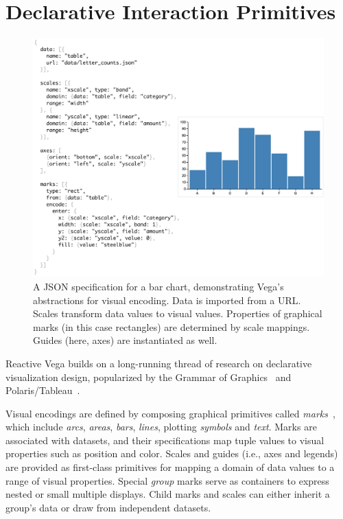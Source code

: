 \graphicspath{{./vega-lang/figures/}}
\chapter{Declarative Interaction Primitives}
\label{sec:vg:lang}

\vspace{-30pt}

\begin{figure}[b!]
  \centering
  \includegraphics[width=0.95\columnwidth]{barChart}
  \caption{A JSON specification for a bar chart, demonstrating Vega's
  abstractions for visual encoding. Data is imported from a URL. Scales
  transform data values to visual values. Properties of graphical marks (in
  this case rectangles) are determined by scale mappings. Guides (here, axes)
  are instantiated as well.}
  \label{fig:vg:barChart}
\end{figure}

Reactive Vega builds on a long-running thread of research on declarative
visualization design, popularized by the Grammar of
Graphics~\cite{wilkinson:grammar} and Polaris/Tableau~\cite{stolte:polaris}.

Visual encodings are defined by composing graphical primitives called
\emph{marks}~\cite{bostock:protovis}, which include \emph{arcs}, \emph{areas},
\emph{bars}, \emph{lines}, plotting \emph{symbols} and \emph{text}. Marks are
associated with datasets, and their specifications map tuple values to visual
properties such as position and color. Scales and guides (i.e., axes and
legends) are provided as first-class primitives for mapping a domain of data
values to a range of visual properties. Special \emph{group} marks serve as
containers to express nested or small multiple displays. Child marks and scales
can either inherit a group's data or draw from independent datasets.

